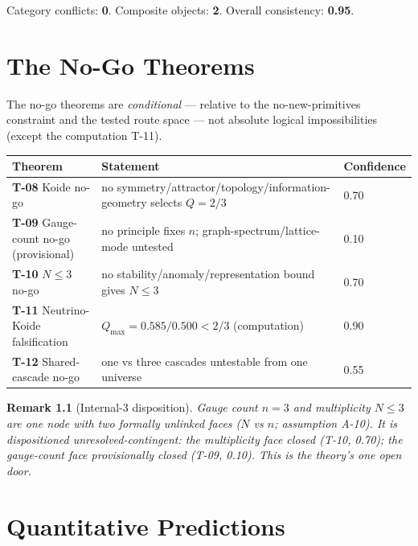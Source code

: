 \documentclass[11pt,twoside]{book}
\newtheorem{remark}[theorem]{Remark}
\begin{document}
Category conflicts: \textbf{0}. Composite objects: \textbf{2}. Overall consistency:
\textbf{0.95}.


\chapter{The No-Go Theorems}
\label{ch:nogo}

The no-go theorems are \emph{conditional} — relative to the no-new-primitives constraint and
the tested route space — not absolute logical impossibilities (except the computation
T-11).

\begin{center}
\begin{tabular}{lll}
\toprule
Theorem & Statement & Confidence \\
\midrule
\textbf{T-08} Koide no-go & no symmetry/attractor/topology/information-geometry selects $Q=2/3$ & 0.70 \\
\textbf{T-09} Gauge-count no-go (provisional) & no principle fixes $n$; graph-spectrum/lattice-mode untested & 0.10 \\
\textbf{T-10} $N\le3$ no-go & no stability/anomaly/representation bound gives $N\le3$ & 0.70 \\
\textbf{T-11} Neutrino-Koide falsification & $Q_{\max}=0.585/0.500 < 2/3$ (computation) & 0.90 \\
\textbf{T-12} Shared-cascade no-go & one vs three cascades untestable from one universe & 0.55 \\
\bottomrule
\end{tabular}
\end{center}

\begin{remark}[Internal-3 disposition]
Gauge count $n=3$ and multiplicity $N\le3$ are one node with two formally unlinked faces
($N$ vs $n$; assumption A-10). It is dispositioned \emph{unresolved-contingent}: the
multiplicity face closed (T-10, 0.70); the gauge-count face \emph{provisionally} closed
(T-09, 0.10). This is the theory's one open door.
\end{remark}


\chapter{Quantitative Predictions}
\label{ch:predictions}
\end{document}
